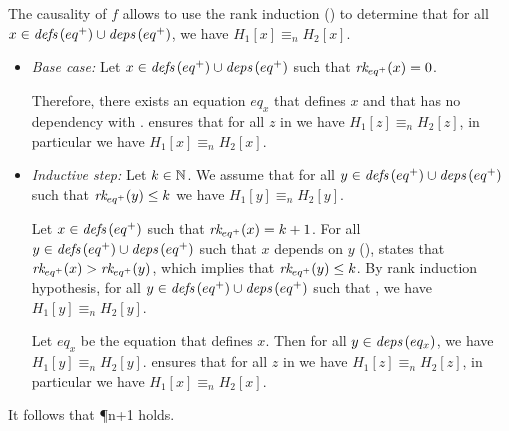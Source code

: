 \begin{skippableproof}
\begin{itemize}
              The causality of $f$ allows to use the rank induction
              () to
              determine that for all $x \in {\ensuremath{\textit{defs}\left(eq^+\right)}} \cup {\ensuremath{\textit{deps}\left(eq^+\right)}}$, we have
              $H_1[x] \equiv_n H_2[x]$.

              \begin{itemize}
                  \item \textit{Base case:} Let $x \in {\ensuremath{\textit{defs}\left(eq^+\right)}} \cup {\ensuremath{\textit{deps}\left(eq^+\right)}}$ such that
                        ${\textit{rk}_{eq^+}(x)} = 0$.

                        Therefore, there exists an equation $eq_x$ that defines $x$ and
                        that has no dependency with .
                         ensures that
                        for all $z$ in  we have $H_1[z] \equiv_n H_2[z]$, in particular
                        we have $H_1[x] \equiv_n H_2[x]$.

                  \item \textit{Inductive step:} Let $k \in \mathbb{N}$.
                        We assume that for all $y \in {\ensuremath{\textit{defs}\left(eq^+\right)}} \cup {\ensuremath{\textit{deps}\left(eq^+\right)}}$ such that
                        ${\textit{rk}_{eq^+}(y)} \le k$ we have $H_1[y] \equiv_n H_2[y]$.

                        Let $x \in {\ensuremath{\textit{defs}\left(eq^+\right)}}$ such that ${\textit{rk}_{eq^+}(x)} = k+1$.
                        For all $y \in {\ensuremath{\textit{defs}\left(eq^+\right)}} \cup {\ensuremath{\textit{deps}\left(eq^+\right)}}$ such that $x$ depends on $y$ (\ie {}),
                        states that ${\textit{rk}_{eq^+}(x)} > {\textit{rk}_{eq^+}(y)}$, which implies that ${\textit{rk}_{eq^+}(y)} \le k$.
                        By rank induction hypothesis, for all $y \in {\ensuremath{\textit{defs}\left(eq^+\right)}} \cup {\ensuremath{\textit{deps}\left(eq^+\right)}}$ such that
                        , we have $H_1[y] \equiv_n H_2[y]$.

                        Let $eq_x$ be the equation that defines $x$. Then for all $y \in {\ensuremath{\textit{deps}\left(eq_x\right)}}$, we have
                        $H_1[y] \equiv_n H_2[y]$. 
                        ensures that for all $z$ in  we have $H_1[z] \equiv_n H_2[z]$, in
                        particular we have $H_1[x] \equiv_n H_2[x]$.
              \end{itemize}

              It follows that \P{{n+1}} holds.
    \end{itemize}


\end{skippableproof}
